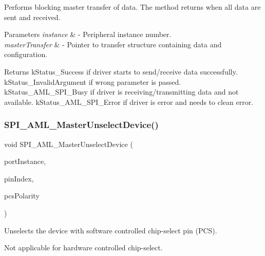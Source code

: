 Performs blocking master transfer of data. The method returns when all data are sent and received. 


\begin{DoxyParams}{Parameters}
{\em instance} & -\/ Peripheral instance number. \\
\hline
{\em master\+Transfer} & -\/ Pointer to transfer structure containing data and configuration.\\
\hline
\end{DoxyParams}
\begin{DoxyReturn}{Returns}
k\+Status\+\_\+\+Success if driver starts to send/receive data successfully. k\+Status\+\_\+\+Invalid\+Argument if wrong parameter is passed. k\+Status\+\_\+\+A\+M\+L\+\_\+\+S\+P\+I\+\_\+\+Busy if driver is receiving/transmitting data and not available. k\+Status\+\_\+\+A\+M\+L\+\_\+\+S\+P\+I\+\_\+\+Error if driver is error and needs to clean error. 
\end{DoxyReturn}
\mbox{\label{group__function__group_gacef541f53ec06c7151d8c6f148d4b365}} 
\subsubsection{\texorpdfstring{SPI\_AML\_MasterUnselectDevice()}{SPI\_AML\_MasterUnselectDevice()}}
{\footnotesize\ttfamily void S\+P\+I\+\_\+\+A\+M\+L\+\_\+\+Master\+Unselect\+Device (\begin{DoxyParamCaption}\item[{\mbox{\hyperlink{common__aml_8h_a562bd37c7d07adcedec5993bc0cd96e5}{aml\+\_\+instance\+\_\+t}}}]{port\+Instance,  }\item[{uint8\+\_\+t}]{pin\+Index,  }\item[{\mbox{\hyperlink{group__enum__group_ga376ab165389ceb9a6e3f763263ff7e06}{spi\+\_\+aml\+\_\+pcs\+\_\+polarity\+\_\+t}}}]{pcs\+Polarity }\end{DoxyParamCaption})}



Unselects the device with software controlled chip-\/select pin (P\+CS). 

Not applicable for hardware controlled chip-\/select.


